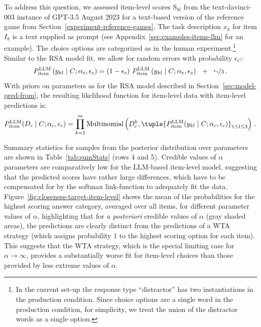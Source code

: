 \documentclass[fleqn]{article}
\begin{document}
To address this question, we assessed item-level scores $\text{S}_{kl}$ from the text-davinci-003 instance of GPT-3.5 August 2023 \citep{BrownMann2020:Language-Models} for a text-based version of the reference game from Section~\ref{experiment-reference-games}.
The task description $x_{k}$ for item $I_{k}$ is a text supplied as prompt (see Appendix~\ref{sec:examples-items-llm} for an example).
The choice options are categorized as in the human experiment.\footnote{
  In the current set-up the response type ``distractor'' has two instantiations in the production condition. Since choice options are a single word in the production condition, for simplicity, we treat the union of the distractor words as a single option.}
Similar to the RSA model fit, we allow for random errors with probability $\epsilon_{C}$:
%
\begin{align*}
  P_{\text{item}}^{\text{LLM}}\left ( y_{kl} \mid C; \alpha_{c}, \epsilon_{c} \right )
  = (1- \epsilon_{c}) \  P_{\text{item}}^{\text{LLM}}\left ( y_{kl} \mid C; \alpha_{c}, \epsilon_{c} \right ) \ \ + \ \ \nicefrac{\epsilon_{c}}{3}   \,.
\end{align*}
%
With priors on parameters as for the RSA model described in Section~\ref{sec:model-pred-from}, the resulting likelihood function for item-level data with item-level predictions is:
%
\begin{align*}
 P^{\text{LLM}}_{\text{item}}(D_{c} \mid C; \alpha_{c}, \epsilon_{c}) = \prod_{k = 1}^{m} \text{Multinomial} \left ( D_{c}^{k}, \tuple{P^{\text{LLM}}_{\text{item}}(y_{kl} \mid C;  \alpha_{c}, \epsilon_{c})}_{1 \le l \le 3} \right )\,.
\end{align*}
%

Summary statistics for samples from the posterior distribution over parameters are shown in Table~\ref{tab:sumStats} (rows 4 and 5).
Credible values of $\alpha$ parameters are comparatively low for the LLM-based item-level model, suggesting that the predicted scores have rather large differences, which have to be compensated for by the softmax link-function to adequately fit the data.
Figure~\ref{fig:closeness-target-item-level} shows the mean of the probabilities for the highest scoring answer category, averaged over all items, for different parameter values of $\alpha$, highlighting that for \textit{a posteriori} credible values of $\alpha$ (gray shaded areas), the predictions are clearly distinct from the predictions of a WTA strategy (which assigns probability 1 to the highest scoring option for each item).
This suggests that the WTA strategy, which is the special limiting case for $\alpha \rightarrow \infty$, provides a substantially worse fit for item-level choices than those provided by less extreme values of $\alpha$.
\end{document}
